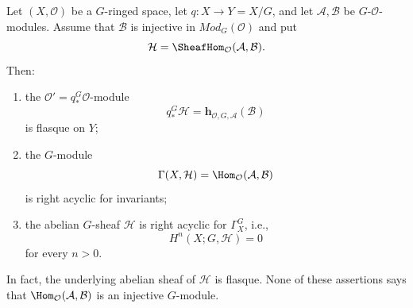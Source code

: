\begin{lemma}
\label{lemma-equivariant-hom-injective-acyclic}
\begin{reference}
\cite[Chapter V, \S 5.6, Lemma 5.6.1 and proof, p. 215]{Tohoku}
\end{reference}
Let $(X,\mathcal O)$ be a $G$-ringed space, let $q:X\to Y=X/G$, and let
$\mathcal A,\mathcal B$ be $G$-$\mathcal O$-modules. Assume that
$\mathcal B$ is injective in $\textit{Mod}_G(\mathcal O)$ and put
$$
\mathcal H=
\SheafHom_{\mathcal O}(\mathcal A,\mathcal B).
$$
Then:
\begin{enumerate}
\item the $\mathcal O'=q_*^G\mathcal O$-module
$$
q_*^G\mathcal H
=
\mathbf h_{\mathcal O,G,\mathcal A}(\mathcal B)
$$
is flasque on $Y$;
\item the $G$-module
$$
\Gamma(X,\mathcal H)
=
\Hom_{\mathcal O}(\mathcal A,\mathcal B)
$$
is right acyclic for invariants;
\item the abelian $G$-sheaf $\mathcal H$ is right acyclic for
$\Gamma_X^G$, i.e.,
$$
H^n(X;G,\mathcal H)=0
$$
for every $n>0$.
\end{enumerate}
In fact, the underlying abelian sheaf of $\mathcal H$ is flasque. None of
these assertions says that $\Hom_{\mathcal O}(\mathcal A,\mathcal B)$ is
an injective $G$-module.
\end{lemma}

